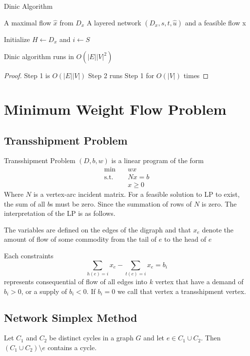 			\begin{algorithm}
				\caption{Dinic Algorithm}
				\begin{algorithmic}
					\Ensure A maximal flow $\hat{x}$ from $D_x$
					\Require A layered network $(D_x, s, t, \hat{u})$ and a feasible flow x

					\State Initialize $H\gets D_x$ and $i\gets S$
				\end{algorithmic}
			\end{algorithm}

			\begin{theorem}
				Dinic algorithm runs in $O(|E||V|^2)$
			\end{theorem}

			\begin{proof}
				Step 1 is $O(|E||V|)$
				Step 2 runs Step 1 for $O(|V|)$ times
			\end{proof}

	\chapter{Minimum Weight Flow Problem}
		\section{Transshipment Problem}
			Transshipment Problem $(D, b, w)$ is a linear program of the form
			\begin{align}
				\min \quad & wx\\
				\text{s.t.} \quad & Nx = b\\
								  & x \ge 0
			\end{align}
			Where $N$ is a vertex-arc incident matrix. For a feasible solution to LP to exist, the sum of all $b$s must be zero. Since the summation of rows of $N$ is zero. The interpretation of the LP is as follows.

			The variables are defined on the edges of the digraph and that $x_e$ denote the amount of flow of some commodity from the tail of $e$ to the head of $e$

			Each constraints
			\begin{equation}
				\sum_{h(e) = i} x_e - \sum_{t(e) = i}x_e = b_i
			\end{equation}
			represents consequential of flow of all edges into $k$ vertex that have a demand of $b_i > 0$, or a supply of $b_i < 0$. If $b_i = 0$ we call that vertex a transshipment vertex.

		\section{Network Simplex Method}
			\begin{lemma}
				Let $C_1$ and $C_2$ be distinct cycles in a graph $G$ and let $e\in C_1 \cup C_2$. Then $(C_1 \cup C_2) \setminus e$ contains a cycle.
			\end{lemma}

